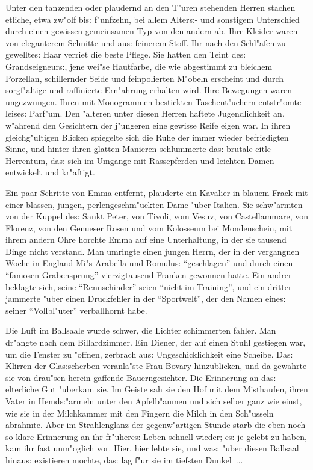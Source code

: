 \documentclass[oneside,12pt]{book}
\newcommand{\s}{s:}%
\begin{document}
Unter den tanzenden oder plaudernd an den T"uren stehenden Herren
stachen etliche, etwa zw"olf bi{\s} f"unfzehn, bei allem
Alter{\s}- und sonstigem Unterschied durch einen gewissen
gemeinsamen Typ von den andern ab. Ihre Kleider waren von
eleganterem Schnitte und au{\s} feinerem Stoff. Ihr nach den
Schl"afen zu gewellte{\s} Haar verriet die beste Pflege. Sie
hatten den Teint de{\s} Grandseigneur{\s}, jene wei"se Hautfarbe,
die wie abgestimmt zu bleichem Porzellan, schillernder Seide und
feinpolierten M"obeln erscheint und durch sorgf"altige und
raffinierte Ern"ahrung erhalten wird. Ihre Bewegungen waren
ungezwungen. Ihren mit Monogrammen bestickten Taschent"uchern
entstr"omte leise{\s} Parf"um. Den "alteren unter diesen Herren
haftete Jugendlichkeit an, w"ahrend den Gesichtern der j"ungeren
eine gewisse Reife eigen war. In ihren gleichg"ultigen Blicken
spiegelte sich die Ruhe der immer wieder befriedigten Sinne, und
hinter ihren glatten Manieren schlummerte da{\s} brutale eitle
Herrentum, da{\s} sich im Umgange mit Rassepferden und leichten
Damen entwickelt und kr"aftigt.

Ein paar Schritte von Emma entfernt, plauderte ein Kavalier in
blauem Frack mit einer blassen, jungen, perlengeschm"uckten Dame
"uber Italien. Sie schw"armten von der Kuppel de{\s} Sankt Peter,
von Tivoli, vom Vesuv, von Castellammare, von Florenz, von den
Genueser Rosen und vom Kolosseum bei Mondenschein, mit ihrem
andern Ohre horchte Emma auf eine Unterhaltung, in der sie tausend
Dinge nicht verstand. Man umringte einen jungen Herrn, der in der
vergangnen Woche in England Mi"s Arabella und Romulu{\s}
"`geschlagen"' und durch einen "`famosen Grabensprung"'
vierzigtausend Franken gewonnen hatte. Ein andrer beklagte sich,
seine "`Rennschinder"' seien "`nicht im Training"', und ein
dritter jammerte "uber einen Druckfehler in der "`Sportwelt"', der
den Namen eine{\s} seiner "`Vollbl"uter"' verballhornt habe.

Die Luft im Ballsaale wurde schwer, die Lichter schimmerten
fahler. Man dr"angte nach dem Billardzimmer. Ein Diener, der auf
einen Stuhl gestiegen war, um die Fenster zu "offnen, zerbrach
au{\s} Ungeschicklichkeit eine Scheibe. Da{\s} Klirren der
Gla{\s}scherben veranla"ste Frau Bovary hinzublicken, und da
gewahrte sie von drau"sen herein gaffende Bauerngesichter. Die
Erinnerung an da{\s} elterliche Gut "uberkam sie. Im Geiste sah
sie den Hof mit dem Misthaufen, ihren Vater in Hemd{\s}"armeln
unter den Apfelb"aumen und sich selber ganz wie einst, wie sie in
der Milchkammer mit den Fingern die Milch in den Sch"usseln
abrahmte. Aber im Strahlenglanz der gegenw"artigen Stunde starb
die eben noch so klare Erinnerung an ihr fr"uhere{\s} Leben
schnell wieder; e{\s} je gelebt zu haben, kam ihr fast unm"oglich
vor. Hier, hier lebte sie, und wa{\s} "uber diesen Ballsaal
hinau{\s} existieren mochte, da{\s} lag f"ur sie im tiefsten
Dunkel~...
\end{document}
